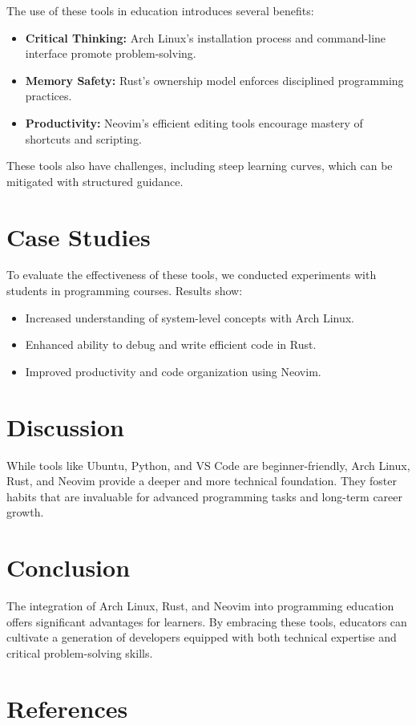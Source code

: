 \documentclass[12pt]{article}
\begin{document}
The use of these tools in education introduces several benefits:
\begin{itemize}
    \item \textbf{Critical Thinking:} Arch Linux's installation process and command-line interface promote problem-solving.
    \item \textbf{Memory Safety:} Rust's ownership model enforces disciplined programming practices.
    \item \textbf{Productivity:} Neovim's efficient editing tools encourage mastery of shortcuts and scripting.
\end{itemize}

These tools also have challenges, including steep learning curves, which can be mitigated with structured guidance.

\section{Case Studies}

To evaluate the effectiveness of these tools, we conducted experiments with students in programming courses. Results show:
\begin{itemize}
    \item Increased understanding of system-level concepts with Arch Linux.
    \item Enhanced ability to debug and write efficient code in Rust.
    \item Improved productivity and code organization using Neovim.
\end{itemize}

\section{Discussion}

While tools like Ubuntu, Python, and VS Code are beginner-friendly, Arch Linux, Rust, and Neovim provide a deeper and more technical foundation. They foster habits that are invaluable for advanced programming tasks and long-term career growth.

\section{Conclusion}

The integration of Arch Linux, Rust, and Neovim into programming education offers significant advantages for learners. By embracing these tools, educators can cultivate a generation of developers equipped with both technical expertise and critical problem-solving skills.

\section{References}



\end{document}
